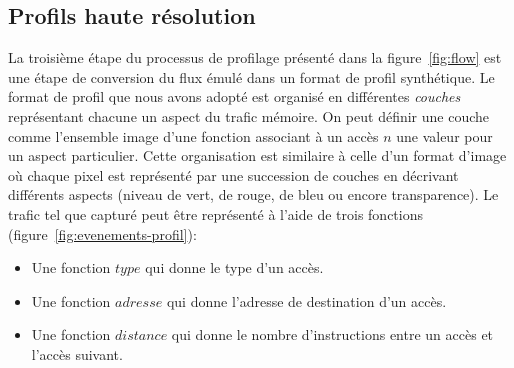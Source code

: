 \subsection{Profils haute résolution}



La troisième étape du processus de profilage présenté dans la figure~\ref{fig:flow} est une étape de conversion du flux émulé dans un format de profil synthétique.
Le format de profil que nous avons adopté est organisé en différentes \emph{couches} représentant chacune un aspect du trafic mémoire.
On peut définir une couche comme l'ensemble image d'une fonction associant à un accès $n$ une valeur pour un aspect particulier.
Cette organisation est similaire à celle d'un format d'image où chaque pixel est représenté par une succession de couches en décrivant différents aspects (niveau de vert, de rouge, de bleu ou encore transparence).
Le trafic tel que capturé peut être représenté à l'aide de trois fonctions (figure~\ref{fig:evenements-profil}):
\begin{itemize}
	\item Une fonction $type$ qui donne le type d'un accès.
	\item Une fonction $adresse$ qui donne l'adresse de destination d'un accès.
	\item Une fonction $distance$ qui donne le nombre d'instructions entre un accès et l'accès suivant.
\end{itemize}

